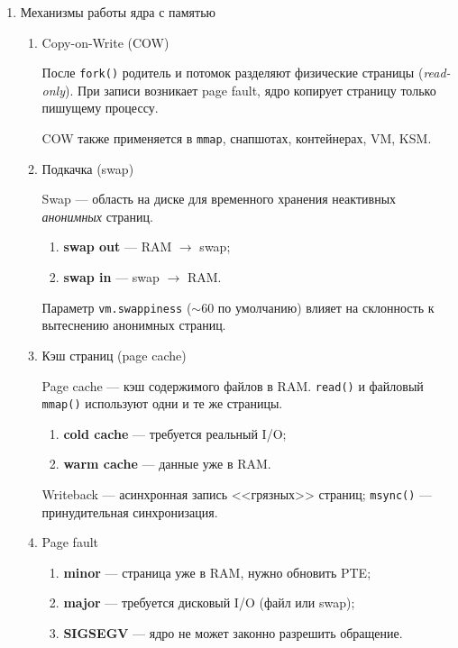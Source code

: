 \begin{enumerate}
\item Механизмы работы ядра с памятью \label{sec:6}

\begin{enumerate}

\item Copy-on-Write (COW)

После \texttt{fork()} родитель и потомок разделяют физические страницы
(\emph{read-only}). При записи возникает page fault, ядро копирует
страницу только пишущему процессу.

COW также применяется в \texttt{mmap}, снапшотах, контейнерах, VM, KSM.

\item Подкачка (swap)

Swap — область на диске для временного хранения неактивных
\emph{анонимных} страниц.

\begin{enumerate}
    \item \textbf{swap out} — RAM \(\to\) swap;
    \item \textbf{swap in} — swap \(\to\) RAM.
\end{enumerate}

Параметр \texttt{vm.swappiness} (\(\sim\)60 по умолчанию) влияет на
склонность к вытеснению анонимных страниц.

\item Кэш страниц (page cache)

Page cache — кэш содержимого файлов в RAM. \texttt{read()} и файловый
\texttt{mmap()} используют одни и те же страницы.

\begin{enumerate}
    \item \textbf{cold cache} — требуется реальный I/O;
    \item \textbf{warm cache} — данные уже в RAM.
\end{enumerate}

Writeback — асинхронная запись <<грязных>> страниц; \texttt{msync()} —
принудительная синхронизация.

\item Page fault

\begin{enumerate}
    \item \textbf{minor} — страница уже в RAM, нужно обновить PTE;
    \item \textbf{major} — требуется дисковый I/O (файл или swap);
    \item \textbf{SIGSEGV} — ядро не может законно разрешить обращение.
\end{enumerate}


\end{enumerate}
\end{enumerate}
